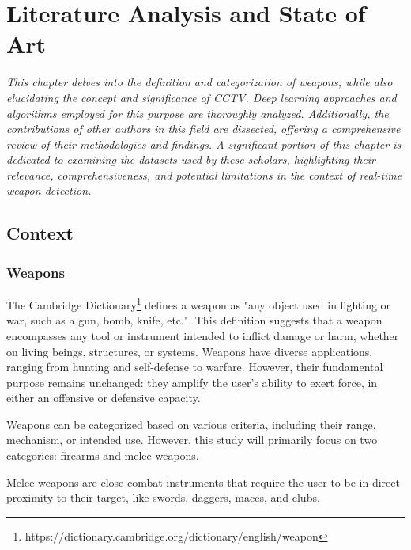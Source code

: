 
\renewcommand{\arraystretch}{2}
\renewcommand{\figurename}{Figure}
\chapter{Literature Analysis and State of Art}
\label{chapter:literarure}

\newenvironment{literature}
{\quote\itshape}
{\endquote}

\begin{literature}
This chapter delves into the definition and categorization of weapons, while also elucidating the concept and significance of CCTV. Deep learning approaches and algorithms employed for this purpose are thoroughly analyzed. Additionally, the contributions of other authors in this field are dissected, offering a comprehensive review of their methodologies and findings. A significant portion of this chapter is dedicated to examining the datasets used by these scholars, highlighting their relevance, comprehensiveness, and potential limitations in the context of real-time weapon detection.
\end{literature}

\section{Context}
\subsection{Weapons}
The Cambridge Dictionary\footnote{https://dictionary.cambridge.org/dictionary/english/weapon} defines a weapon as "any object used in fighting or war, such as a gun, bomb, knife, etc.". This definition suggests that a weapon encompasses any tool or instrument intended to inflict damage or harm, whether on living beings, structures, or systems. Weapons have diverse applications, ranging from hunting and self-defense to warfare. However, their fundamental purpose remains unchanged: they amplify the user's ability to exert force, in either an offensive or defensive capacity.

Weapons can be categorized based on various criteria, including their range, mechanism, or intended use. However, this study will primarily focus on two categories: firearms and melee weapons.

Melee weapons are close-combat instruments that require the user to be in direct proximity to their target, like swords, daggers, maces, and clubs.

